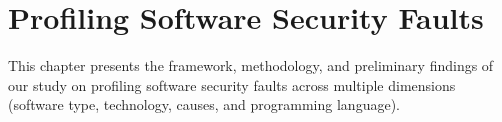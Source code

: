 \chapter{Profiling Software Security Faults} \label{chap:ch3}

This chapter presents the framework, methodology, and preliminary findings of our study on profiling software security faults across multiple dimensions (software type, technology, causes, and programming language). 










